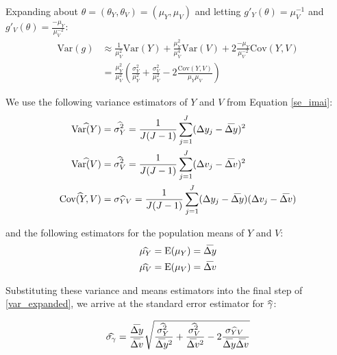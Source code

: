 \documentclass[12pt]{article}
\newcommand\wh[1]{\hstretch{2}{\hat{\hstretch{.5}{#1}}}}
\newcommand\wb[1]{\hstretch{2}{\bar{\hstretch{.5}{#1}}}}
\begin{document}
Expanding about $\theta=(\theta_Y,\theta_V)=(\mu_Y,\mu_V)$ and letting $g'_Y(\theta) = \mu_V^{-1}$ and $g'_V(\theta) = \frac{-\mu_Y}{\mu_V^{-2}}$:
\begin{equation} \label{var_expanded}
\begin{split}
	\text{Var}(g) & \approx \frac{1}{\mu_V^2}\text{Var}(Y) + \frac{\mu_Y^2}{\mu_V^4}\text{Var}(V) + 2\frac{-\mu_Y}{\mu_V^{-2}}\text{Cov}(Y,V) \\
	& = \frac{\mu_Y^2}{\mu_V^2}(\frac{\sigma_Y^2}{\mu_Y^2} + \frac{\sigma_V^2}{\mu_V^2} - 2\frac{\text{Cov}(Y,V)}{\mu_Y \mu_V})
\end{split}
\end{equation}

We use the following variance estimators of $Y$ and $V$ from Equation \ref{se_imai}:
\begin{equation}
\begin{split}
\wh{\text{Var}(Y)} & = \wh{\sigma_Y^2} = \frac{1}{J(J-1)}\sum_{j=1}^{J} (\Delta y_j - \wb{\Delta y})^2 \\
\wh{\text{Var}(V)} & = \wh{\sigma_V^2} = \frac{1}{J(J-1)}\sum_{j=1}^{J} (\Delta v_j - \wb{\Delta v})^2 \\
\wh{\text{Cov}(Y,V)} & = \wh{\sigma_{YV}} = \frac{1}{J(J-1)}\sum_{j=1}^{J} (\Delta y_j - \wb{\Delta y})(\Delta v_j - \wb{\Delta v})
\end{split}
\end{equation}

and the following estimators for the population means of $Y$ and $V$:
\begin{equation}
\begin{split}
\wh{\mu_Y} & = \operatorname{E}(\mu_Y) = \wb{\Delta y} \\
\wh{\mu_V} & = \operatorname{E}(\mu_V) = \wb{\Delta v}
\end{split}
\end{equation}

Substituting these variance and means estimators into the final step of \ref{var_expanded}, we arrive at the standard error estimator for $\wh{\gamma}$:

\begin{equation}
	\wh{\sigma_{\gamma}} = \frac{\wb{\Delta y}}{\wb{\Delta v}} \sqrt{ \frac{\wh{\sigma_Y^2}}{\wb{\Delta y}^2} + \frac{\wh{\sigma_V^2}}{\wb{\Delta v}^2} - 2 \frac{\wh{\sigma_{YV}}}{\wb{\Delta y} \wb{\Delta v}} }
\end{equation}

\clearpage

\end{document}
